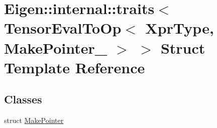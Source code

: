 \hypertarget{struct_eigen_1_1internal_1_1traits_3_01_tensor_eval_to_op_3_01_xpr_type_00_01_make_pointer___01_4_01_4}{}\section{Eigen\+:\+:internal\+:\+:traits$<$ Tensor\+Eval\+To\+Op$<$ Xpr\+Type, Make\+Pointer\+\_\+ $>$ $>$ Struct Template Reference}
\label{struct_eigen_1_1internal_1_1traits_3_01_tensor_eval_to_op_3_01_xpr_type_00_01_make_pointer___01_4_01_4}
\subsection*{Classes}
\begin{DoxyCompactItemize}
\item 
struct \hyperlink{struct_eigen_1_1internal_1_1traits_3_01_tensor_eval_to_op_3_01_xpr_type_00_01_make_pointer___01_4_01_4_1_1_make_pointer}{Make\+Pointer}
\end{DoxyCompactItemize}
